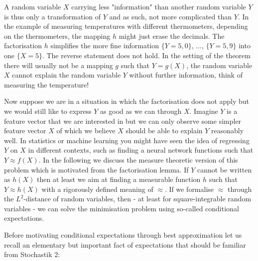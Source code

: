 	 A random variable $X$ carrying less "{}information"{} than another random variable $Y$ is thus only a transformation of $Y$ and as such, not more complicated than $Y$. In the example of measuring temperatures with different thermometers, depending on the thermometers, the mapping $h$ might just erase the decimals. The factorisation $h$ simplifies the more fine information $\{Y=5,0\}$, ..., $\{Y=5,9\}$ into one $\{X=5\}$.  The reverse statement does not hold. In the setting of the theorem there will usually not be a mapping $g$ such that $Y=g(X)$, the random variable $X$ cannot explain the random variable $Y$ without further information, think of measuring the temperature!\smallskip
	
	 Now suppose we are in a situation in which the factorisation does not apply but we would still like to express $Y$ as good as we can through $X$. Imagine $Y$ is a feature vector that we are interested in but we can only observe some simpler feature vector $X$ of which we believe $X$ should be able to explain $Y$ reasonably well. In statistics or machine learning you might have seen the idea of regressing $Y$ on $X$ in different contexts, such as finding a neural network functions such that $Y\approx f(X)$. In the following we discuss the measure theoretic version of this problem which is motivated from the factorisation lemma. If $Y$ cannot be written as $h(X)$ then at least we aim at finding a measurable function $h$ such that $Y\approx h(X)$ with a rigorously defined meaning of $\approx$. If we formalise $\approx$ through the $L^2$-distance of random variables, then - at least for square-integrable random variables - we can solve the minimisation problem using so-called conditional expectations. \smallskip
	 
	 
Before motivating conditional expectations through best approximation let us recall an elementary but important fact of expectations that should be familiar from Stochastik 2:
	
	
	
